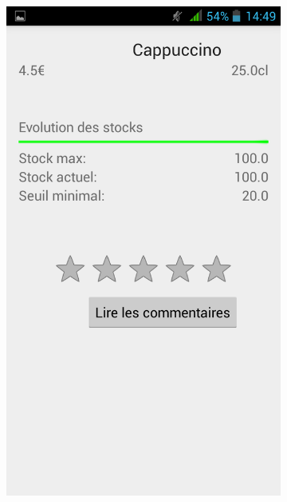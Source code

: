 \begin{figure}[H]
    \centering
    \begin{subfigure}
        \centering
        \includegraphics[scale=0.15]{img/stock-full.png}
    \end{subfigure}%
    ~ 
    \begin{subfigure}
        \centering

\end{subfigure}
\end{figure}
